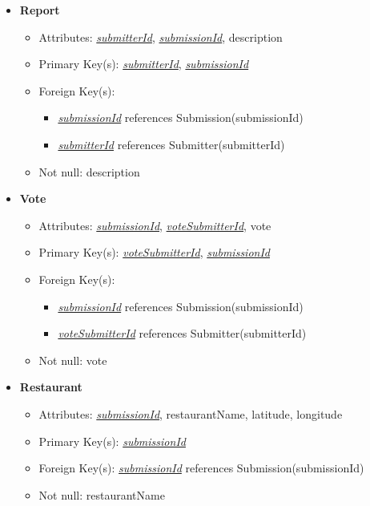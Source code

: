 \begin{itemize}
        \item \textbf{Report}
        \begin{itemize}
            \item Attributes: \underline{\textit{submitterId}}, \underline{\textit{submissionId}}, description
            \item Primary Key(s): \underline{\textit{submitterId}}, \underline{\textit{submissionId}}
            \item Foreign Key(s): 
            \begin{itemize}
                \item \underline{\textit{submissionId}} references Submission(submissionId)
                \item \underline{\textit{submitterId}} references Submitter(submitterId)
            \end{itemize}
            \item Not null: description
        \end{itemize}

        \item \textbf{Vote}
        \begin{itemize}
            \item Attributes: \underline{\textit{submissionId}}, \underline{\textit{voteSubmitterId}}, vote
            \item Primary Key(s): \underline{\textit{voteSubmitterId}}, \underline{\textit{submissionId}}
            \item Foreign Key(s): 
                \begin{itemize}
                    \item \underline{\textit{submissionId}} references Submission(submissionId)
                    \item \underline{\textit{voteSubmitterId}} references Submitter(submitterId)
                \end{itemize}
            \item Not null: vote
        \end{itemize}

        \item \textbf{Restaurant}
        \begin{itemize}
            \item Attributes: \underline{\textit{submissionId}}, restaurantName, latitude, longitude
            \item Primary Key(s): \underline{\textit{submissionId}}
            \item Foreign Key(s): \underline{\textit{submissionId}} references Submission(submissionId)
            \item Not null: restaurantName
        \end{itemize}
    

\end{itemize}
